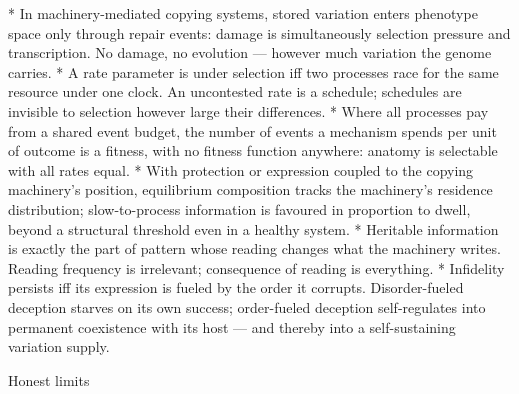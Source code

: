 \begitems
*  In machinery-mediated copying systems,
stored variation enters phenotype space only through repair
events: damage is simultaneously selection pressure and
transcription. No damage, no evolution --- however much variation
the genome carries.
*  A rate parameter is under selection iff two
processes race for the same resource under one clock. An
uncontested rate is a schedule; schedules are invisible to
selection however large their differences.
*  Where all processes pay from a
shared event budget, the number of events a mechanism spends per
unit of outcome is a fitness, with no fitness function anywhere:
anatomy is selectable with all rates equal.
*  With protection or expression coupled to
the copying machinery's position, equilibrium composition tracks
the machinery's residence distribution; slow-to-process
information is favoured in proportion to dwell, beyond a
structural threshold even in a healthy system.
*  Heritable information is exactly the part
of pattern whose reading changes what the machinery writes.
Reading frequency is irrelevant; consequence of reading is
everything.
*  Infidelity persists iff its expression is
fueled by the order it corrupts. Disorder-fueled deception starves
on its own success; order-fueled deception self-regulates into
permanent coexistence with its host --- and thereby into a
self-sustaining variation supply.
\enditems

\sec Honest limits

